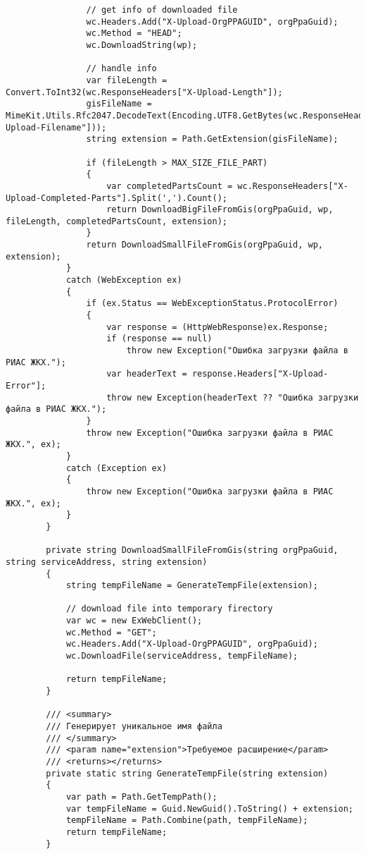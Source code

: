 \begin{lstlisting}
                // get info of downloaded file
                wc.Headers.Add("X-Upload-OrgPPAGUID", orgPpaGuid);
                wc.Method = "HEAD";
                wc.DownloadString(wp);

                // handle info
                var fileLength = Convert.ToInt32(wc.ResponseHeaders["X-Upload-Length"]);
                gisFileName = MimeKit.Utils.Rfc2047.DecodeText(Encoding.UTF8.GetBytes(wc.ResponseHeaders["X-Upload-Filename"]));
                string extension = Path.GetExtension(gisFileName);

                if (fileLength > MAX_SIZE_FILE_PART)
                {
                    var completedPartsCount = wc.ResponseHeaders["X-Upload-Completed-Parts"].Split(',').Count();
                    return DownloadBigFileFromGis(orgPpaGuid, wp, fileLength, completedPartsCount, extension);
                }
                return DownloadSmallFileFromGis(orgPpaGuid, wp, extension);
            }
            catch (WebException ex)
            {
                if (ex.Status == WebExceptionStatus.ProtocolError)
                {
                    var response = (HttpWebResponse)ex.Response;
                    if (response == null)
                        throw new Exception("Ошибка загрузки файла в РИАС ЖКХ.");
                    var headerText = response.Headers["X-Upload-Error"];
                    throw new Exception(headerText ?? "Ошибка загрузки файла в РИАС ЖКХ.");
                }
                throw new Exception("Ошибка загрузки файла в РИАС ЖКХ.", ex);
            }
            catch (Exception ex)
            {
                throw new Exception("Ошибка загрузки файла в РИАС ЖКХ.", ex);
            }
        }

        private string DownloadSmallFileFromGis(string orgPpaGuid, string serviceAddress, string extension)
        {
            string tempFileName = GenerateTempFile(extension);

            // download file into temporary firectory
            var wc = new ExWebClient();
            wc.Method = "GET";
            wc.Headers.Add("X-Upload-OrgPPAGUID", orgPpaGuid);
            wc.DownloadFile(serviceAddress, tempFileName);

            return tempFileName;
        }

        /// <summary>
        /// Генерирует уникальное имя файла
        /// </summary>
        /// <param name="extension">Требуемое расширение</param>
        /// <returns></returns>
        private static string GenerateTempFile(string extension)
        {
            var path = Path.GetTempPath();
            var tempFileName = Guid.NewGuid().ToString() + extension;
            tempFileName = Path.Combine(path, tempFileName);
            return tempFileName;
        }


\end{lstlisting}
